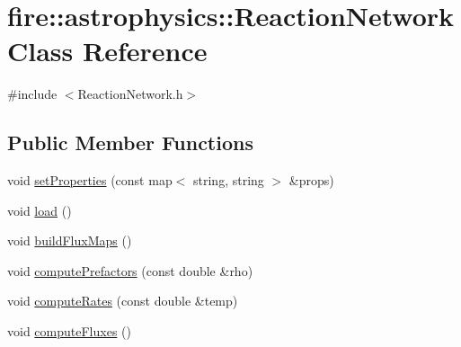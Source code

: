 \hypertarget{a00034}{}\section{fire\+:\+:astrophysics\+:\+:Reaction\+Network Class Reference}
\label{a00034}


{\ttfamily \#include $<$Reaction\+Network.\+h$>$}

\subsection*{Public Member Functions}
\begin{DoxyCompactItemize}
\item 
void \hyperlink{a00034_ab4713cafb974ca41bf6a55619e9fd875}{set\+Properties} (const map$<$ string, string $>$ \&props)
\item 
void \hyperlink{a00034_aa9b4de0566ab0b0f148677d8b97e8c49}{load} ()
\item 
void \hyperlink{a00034_aa0c06237ae72e698aee9cf72d0032fd8}{build\+Flux\+Maps} ()
\item 
void \hyperlink{a00034_ac5b97490e667b011b5e2bea92e16f8b7}{compute\+Prefactors} (const double \&rho)
\item 
void \hyperlink{a00034_a3b1fee4e28576c677d7b852e91c6fa98}{compute\+Rates} (const double \&temp)
\item 
void \hyperlink{a00034_a35a05489358c8e1017bbebb75a9c0114}{compute\+Fluxes} ()
\end{DoxyCompactItemize}
